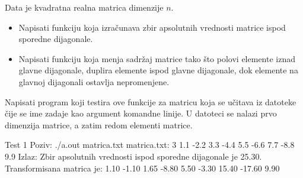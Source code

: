 \begin{Exercise}[label=337]
Data je kvadratna realna matrica dimenzije $n$.
\begin{itemize}
\item Napisati funkciju koja izračunava zbir apsolutnih 
vrednosti matrice ispod sporedne dijagonale. 
\item Napisati funkciju koja menja sadržaj matrice tako 
što polovi elemente iznad glavne dijagonale, duplira 
elemente ispod glavne dijagonale, dok elemente na 
glavnoj dijagonali ostavlja nepromenjene.
\end{itemize}
Napisati program koji testira ove funkcije za matricu koja se
učitava iz datoteke čije se ime zadaje kao argument komandne linije. 
U datoteci se nalazi prvo dimenzija matrice, a zatim redom elementi matrice.

\begin{maxitest}
\begin{test}{Test 1}
Poziv: ./a.out matrica.txt
matrica.txt:  3
              1.1 -2.2 3.3
              -4.4 5.5 -6.6
              7.7 -8.8 9.9
Izlaz: Zbir apsolutnih vrednosti ispod sporedne dijagonale je 25.30.
       Transformisana matrica je:
       1.10 -1.10 1.65 
       -8.80 5.50 -3.30 
       15.40 -17.60 9.90 	   
\end{test}
\end{maxitest}
\end{Exercise}
\begin{Answer}[ref=337]
\end{Answer}


